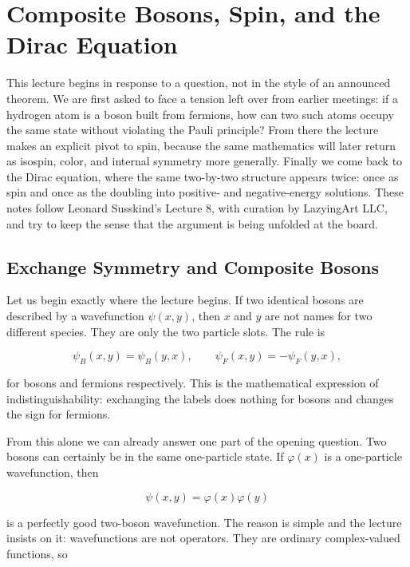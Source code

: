 \chapter{Composite Bosons, Spin, and the Dirac Equation}

This lecture begins in response to a question, not in the style of an announced theorem. We are first asked to face a tension left over from earlier meetings: if a hydrogen atom is a boson built from fermions, how can two such atoms occupy the same state without violating the Pauli principle? From there the lecture makes an explicit pivot to spin, because the same mathematics will later return as isospin, color, and internal symmetry more generally. Finally we come back to the Dirac equation, where the same two-by-two structure appears twice: once as spin and once as the doubling into positive- and negative-energy solutions. These notes follow Leonard Susskind's Lecture 8, with curation by LazyingArt LLC, and try to keep the sense that the argument is being unfolded at the board.

\section{Exchange Symmetry and Composite Bosons}

Let us begin exactly where the lecture begins. If two identical bosons are described by a wavefunction \(\psi(x,y)\), then \(x\) and \(y\) are not names for two different species. They are only the two particle slots. The rule is

\begin{equation}
\psi_B(x,y)=\psi_B(y,x),
\qquad
\psi_F(x,y)=-\psi_F(y,x),
\end{equation}

for bosons and fermions respectively. This is the mathematical expression of indistinguishability: exchanging the labels does nothing for bosons and changes the sign for fermions.

From this alone we can already answer one part of the opening question. Two bosons can certainly be in the same one-particle state. If \(\varphi(x)\) is a one-particle wavefunction, then

\begin{equation}
\psi(x,y)=\varphi(x)\varphi(y)
\end{equation}

is a perfectly good two-boson wavefunction. The reason is simple and the lecture insists on it: wavefunctions are not operators. They are ordinary complex-valued functions, so

